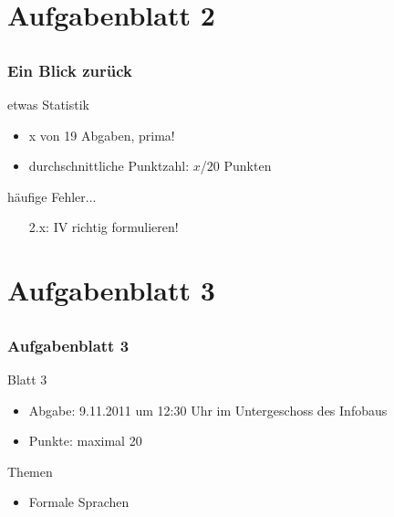 \section[Blatt 2]{Aufgabenblatt 2}
\subsection*{}
\begin{frame}
	\frametitle{Ein Blick zurück}
	\begin{block}{etwas Statistik}
		\begin{itemize}
			\item x von 19 Abgaben, prima!
			\item durchschnittliche Punktzahl: $x$/$20$ Punkten 
		\end{itemize}
	\end{block}

	\begin{block}{häufige Fehler...}
		\begin{itemize}
			\item[2.x:] IV richtig formulieren!
		 \end{itemize}
	\end{block}

\end{frame}

\section[Blatt 3]{Aufgabenblatt 3}
\subsection*{}
\begin{frame}
        \frametitle{Aufgabenblatt 3}
        \begin{block}{Blatt 3}
					\begin{itemize}
						\item Abgabe: 9.11.2011 um 12:30 Uhr im Untergeschoss des Infobaus
						\item Punkte: maximal 20
					\end{itemize}
        \end{block}
        \begin{block}{Themen}
        \begin{itemize}
          	\item Formale Sprachen
        \end{itemize}
        \end{block}
\end{frame}
